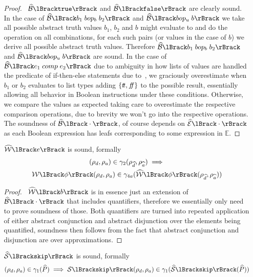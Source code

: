 \begin{proof}
    \pfsketch\
    $\absboolsem{\texttt{true}}$ and $\absboolsem{\texttt{false}}$ are clearly sound.
    In the case of $\absboolsem{b_1 \; bop_b \; b_2}$ and $\absboolsem{bop_u \; b}$ we take all possible abstract truth values $b_1$, $b_2$ and $b$ might evaluate to and do the operation on all combinations, for each such pairs (or values in the case of $b$) we derive all possible abstract truth values.
    Therefore $\absboolsem{b_1 \; bop_b \; b_2}$ and $\absboolsem{bop_u \; b}$ are sound.
    In the case of $\absboolsem{e_1 \; comp \; e_2}$ due to ambiguity in how lists of values are handled the predicate of if-then-else statements due to~\cite{halder_abstract_2012}, we graciously overestimate when $b_1$ or $b_2$ evaluates to list types adding $\{t\!t, f\!\!f\}$ to the possible result, essentially allowing all behavior in Boolean instructions under these conditions.
    Otherwise, we compare the values as expected taking care to overestimate the respective comparison operations, due to brevity we won't go into the respective operations.
    The soundness of $\absboolsem{\cdot}$, of course depends on $\absexpsem{\cdot}$ as each Boolean expression has leafs corresponding to some expression in $\mathbb{E}$.
\end{proof}


\begin{conjecture}
    \label{thm:sound-bexp}
    $\abspredsem{e}$ is sound, formally
    \begin{multline*}
    (\rho_d, \rho_a)
        \in \concrete_2(\env{\ab{d}}, \env{\ab{a}}) \implies \\
        \predsem{\phi}(\rho_d, \rho_a) \in \concrete_{4a}(\abspredsem{\phi}(\env{\ab{d}}, \env{\ab{a}}))
    \end{multline*}
\end{conjecture}


\begin{proof}
    \pfsketch\
    $\abspredsem{b}$ is in essence just an extension of $\absboolsem{\cdot}$ that includes quantifiers, therefore we essentially only need to prove soundness of those.
    Both quantifiers are turned into repeated application of either abstract conjunction and abstract disjunction over the elements being quantified, soundness then follows from the fact that abstract conjunction and disjunction are over approximations.
\end{proof}


\begin{conjecture}
    \label{thm:sound-skip}
    $\abssem{\texttt{skip}}$ is sound, formally
    \begin{equation*}
    (\rho_d, \rho_a)
        \in \concrete_1(\ab{P}) \implies \sem{\texttt{skip}}(\rho_d, \rho_a) \in \concrete_1(\abssem{\texttt{skip}}(\ab{P}))
    \end{equation*}
\end{conjecture}

